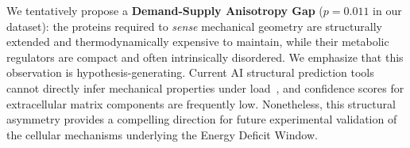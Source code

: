 We tentatively propose a \textbf{Demand-Supply Anisotropy Gap} ($p = 0.011$ in our dataset): the proteins required to \emph{sense} mechanical geometry are structurally extended and thermodynamically expensive to maintain, while their metabolic regulators are compact and often intrinsically disordered. We emphasize that this observation is hypothesis-generating. Current AI structural prediction tools cannot directly infer mechanical properties under load~\cite{gomes2022protein, zonta2024sequence}, and confidence scores for extracellular matrix components are frequently low. Nonetheless, this structural asymmetry provides a compelling direction for future experimental validation of the cellular mechanisms underlying the Energy Deficit Window.
